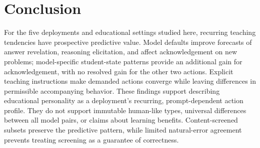 \section{Conclusion}

For the five deployments and educational settings studied here, recurring
teaching tendencies have prospective predictive value. Model defaults improve
forecasts of answer revelation, reasoning elicitation, and affect
acknowledgement on new problems; model-specific student-state patterns provide
an additional gain for acknowledgement, with no resolved gain for the other
two actions. Explicit teaching instructions make demanded actions converge
while leaving differences in permissible accompanying behavior. These findings
support describing educational personality as a deployment's recurring,
prompt-dependent action profile. They do not support immutable human-like
types, universal differences between all model pairs, or claims about learning
benefits. Content-screened subsets preserve the predictive pattern, while
limited natural-error agreement prevents treating screening as a guarantee
of correctness.
